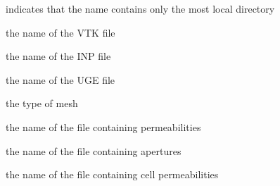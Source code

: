 \documentclass[letterpaper,10pt,english]{sphinxmanual}
\begin{document}
\begin{fulllineitems}
\begin{fulllineitems}
indicates that the name contains only the most local directory

\end{fulllineitems}



\begin{fulllineitems}
the name of the VTK file

\end{fulllineitems}



\begin{fulllineitems}
the name of the INP file

\end{fulllineitems}



\begin{fulllineitems}
the name of the UGE file

\end{fulllineitems}



\begin{fulllineitems}
the type of mesh

\end{fulllineitems}



\begin{fulllineitems}
the name of the file containing permeabilities

\end{fulllineitems}



\begin{fulllineitems}
the name of the file containing apertures

\end{fulllineitems}



\begin{fulllineitems}
the name of the file containing cell permeabilities

\end{fulllineitems}




\end{fulllineitems}
\end{document}
